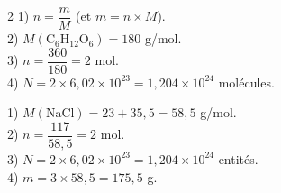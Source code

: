 \begin{multicols}{2}
1) $n=\dfrac mM$ (et $m=n\times M$).\\
2) $M(\mathrm{C_6H_{12}O_6})=180$ g/mol.\\
3) $n=\dfrac{360}{180}=2$ mol.\\
4) $N=2\times6{,}02\times10^{23}=1{,}204\times10^{24}$ molécules.

1) $M(\mathrm{NaCl})=23+35{,}5=58{,}5$ g/mol.\\
2) $n=\dfrac{117}{58{,}5}=2$ mol.\\
3) $N=2\times6{,}02\times10^{23}=1{,}204\times10^{24}$ entités.\\
4) $m=3\times58{,}5=175{,}5$ g.

\end{multicols}
\exercicesBanner
